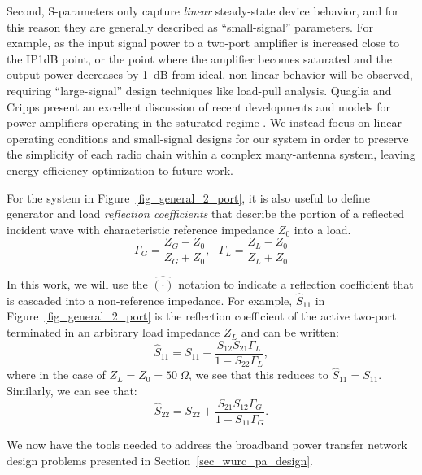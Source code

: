 	Second, S-parameters only capture \emph{linear} steady-state device behavior, and for this reason they are generally described as ``small-signal'' parameters. For example, as the input signal power to a two-port amplifier is increased close to the IP1dB point, or the point where the amplifier becomes saturated and the output power decreases by 1~dB from ideal, non-linear behavior will be observed, requiring ``large-signal'' design techniques like load-pull analysis.
	Quaglia and Cripps present an excellent discussion of recent developments and models for power amplifiers operating in the saturated regime \cite{quaglia2017reappraisal}.
	We instead focus on linear operating conditions and small-signal designs for our system in order to preserve the simplicity of each radio chain within a complex many-antenna system, leaving energy efficiency optimization to future work.

For the system in Figure~\ref{fig_general_2_port}, it is also useful to define generator and load \emph{reflection coefficients} that describe the portion of a reflected incident wave with characteristic reference impedance $Z_0$ into a load.
\begin{equation}
\Gamma_G = \frac{Z_G - Z_0}{Z_G + Z_0},~~~ \Gamma_L = \frac{Z_L - Z_0}{Z_L + Z_0}
\end{equation}

	In this work, we will use the $\hat{(\cdot)}$ notation to indicate a reflection coefficient that is cascaded into a non-reference impedance.
	For example, $\hat{S}_{11}$ in Figure~\ref{fig_general_2_port} is the reflection coefficient of the active two-port terminated in an arbitrary load impedance $Z_L$ and can be written:
\begin{equation} \label{eq_}
\hat{S}_{11}=S_{11}+\frac{S_{12}S_{21}\Gamma_L}{1-S_{22}\Gamma_L},
\end{equation}
where in the case of $Z_L = Z_0 = 50~\Omega$, we see that this reduces to $\hat{S}_{11} = S_{11}$.
	Similarly, we can see that:
\begin{equation}
\hat{S}_{22}=S_{22}+\frac{S_{21}S_{12}\Gamma_G}{1-S_{11}\Gamma_G}.
\end{equation}

	We now have the tools needed to address the broadband power transfer network design problems presented in Section~\ref{sec_wurc_pa_design}.
	